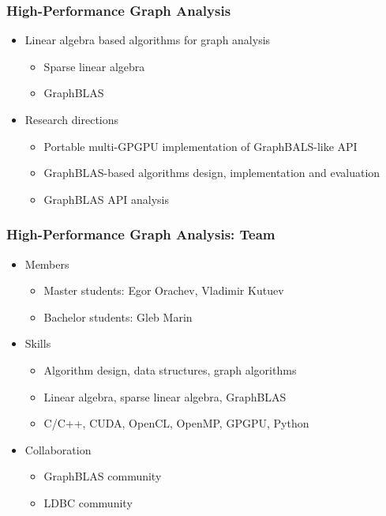 \documentclass[xcolor=table,aspectratio=169]{beamer}
\begin{document}
\begin{frame}[fragile]
  \frametitle{High-Performance Graph Analysis}
  \begin{itemize}
    \item Linear algebra based algorithms for graph analysis
    \begin{itemize}
      \item Sparse linear algebra
      \item GraphBLAS
    \end{itemize} 
    \pause
    \item Research directions
    \begin{itemize}
      \item Portable multi-GPGPU implementation of GraphBALS-like API
      \item GraphBLAS-based algorithms design, implementation and evaluation
      \item GraphBLAS API analysis
    \end{itemize}
  \end{itemize}
\end{frame}

\begin{frame}[fragile]
  \frametitle{High-Performance Graph Analysis: Team}
  \begin{itemize}
    \item Members 
    \begin{itemize}
      \item Master students: Egor Orachev, Vladimir Kutuev
      \item Bachelor students: Gleb Marin
    \end{itemize} 
    \item Skills 
    \begin{itemize}
      \item Algorithm design, data structures, graph algorithms
      \item Linear algebra, sparse linear algebra, GraphBLAS
      \item C/C++, CUDA, OpenCL, OpenMP, GPGPU, Python 
    \end{itemize}
    \item Collaboration
    \begin{itemize}
      \item GraphBLAS community
      \item LDBC community
    \end{itemize}
  \end{itemize}
\end{frame}
\end{document}
